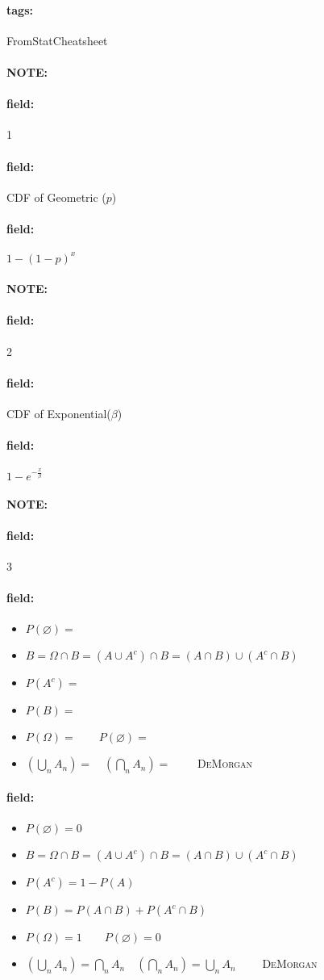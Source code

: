 \documentclass[12pt]{article}
\newenvironment{note}{\paragraph{NOTE:}}{}
\newenvironment{field}{\paragraph{field:}}{}
\newcommand*{\tags}[1]{\paragraph{tags: }#1}
\begin{document}
\tags{FromStatCheatsheet}

\begin{note}
  \begin{field}
    \tiny 1
  \end{field}
  \begin{field}
    CDF of Geometric ($p$)
  \end{field}
  \begin{field}
    $1 - (1-p)^x$
  \end{field}
\end{note}


\begin{note}
  \begin{field}
    \tiny 2
  \end{field}
  \begin{field}
    CDF of Exponential($\beta$)
  \end{field}
  \begin{field}
    $1 - e^{-\frac{x}{\beta}}$
  \end{field}
\end{note}

\begin{note}
  \begin{field}
    \tiny 3
  \end{field}
  \begin{field}
    \begin{itemize}
  \item $P(\varnothing) = $
  \item $B = \Omega \cap B = (A \cup A^c) \cap B
    = (A \cap B) \cup (A^c \cap B)$
  \item $P(A^c) = $
  \item $P(B) = $
  \item $P(\Omega) =  \qquad P(\varnothing) = $
  \item $\left(\bigcup_n A_n\right) =
    \quad
    \left(\bigcap_n A_n\right) =
    \qquad$
    \textsc{DeMorgan}
\end{itemize}
  \end{field}
  \begin{field}
    \begin{itemize}
  \item $P(\varnothing) = 0$
  \item $B = \Omega \cap B = (A \cup A^c) \cap B
    = (A \cap B) \cup (A^c \cap B)$
  \item $P(A^c) = 1 - P(A)$
  \item $P(B) = P(A \cap B) + P(A^c \cap B)$
  \item $P(\Omega) = 1 \qquad P(\varnothing) = 0$
  \item $\left(\bigcup_n A_n\right) = \bigcap_n A_n
    \quad
    \left(\bigcap_n A_n\right) = \bigcup_n A_n
    \qquad$
    \textsc{DeMorgan}
\end{itemize}
  \end{field}
\end{note}
\end{document}
